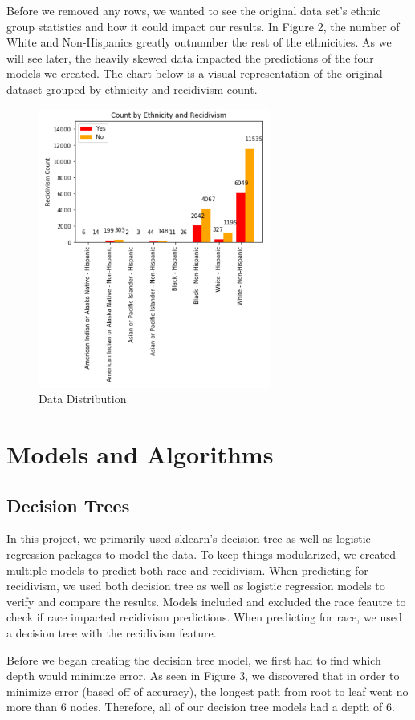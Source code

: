 \documentclass[11pt, sigconf]{acmart}
\begin{document}
Before we removed any rows, we wanted to see the original data set's ethnic group statistics and how it could impact our results. In Figure 2, the number of White and Non-Hispanics greatly outnumber the rest of the ethnicities. As we will see later, the heavily skewed data impacted the predictions of the four models we created. The chart below is a visual representation of the original dataset grouped by ethnicity and recidivism count. 

\begin{figure}[h] 	
\centering
\includegraphics[width=3in]{1.png}
\caption{Data Distribution}
\end{figure}

\section{Models and Algorithms}
\subsection{Decision Trees}
\hspace{5mm} In this project, we primarily used sklearn’s decision tree as well as logistic regression packages to model the data. To keep things modularized, we created multiple models to predict both race and recidivism. When predicting for recidivism, we used both decision tree as well as logistic regression models to verify and compare the results. Models included and excluded the race feautre to check if race impacted recidivism predictions. When predicting for race, we used a decision tree with the recidivism feature.

Before we began creating the decision tree model, we first had to find which depth would minimize error. As seen in Figure 3, we discovered that in order to minimize error (based off of accuracy), the longest path from root to leaf went no more than 6 nodes. Therefore, all of our decision tree models had a depth of 6.
\end{document}
